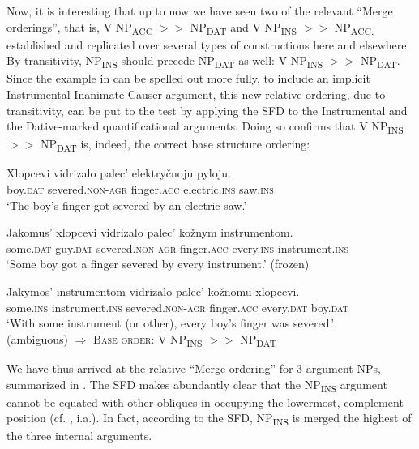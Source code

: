 \documentclass[output=paper,colorlinks,citecolor=brown]{langscibook}
\begin{document}
\noindent Now, it is interesting that up to now we have seen two of the relevant “Merge orderings”, that is, V NP\textsubscript{ACC} $>>$ NP\textsubscript{DAT} and V NP\textsubscript{INS} $>>$ NP\textsubscript{ACC,} established and replicated over several types of constructions here and elsewhere. By transitivity, NP\textsubscript{INS} should precede NP\textsubscript{DAT} as well: V NP\textsubscript{INS} $>>$ NP\textsubscript{DAT}. Since the example in  can be spelled out more fully, to include an implicit Instrumental Inanimate Causer argument, this new relative ordering, due to transitivity, can be put to the test by applying the SFD to the Instrumental and the Dative-marked quantificational arguments. Doing so confirms that V NP\textsubscript{INS} $>>$ NP\textsubscript{DAT} is, indeed, the correct base structure ordering:

\ea%
    \label{ex:antonyuk:29}
\gll            Xlopcevi   vidrizalo    palec’    elektryčnoju pyloju.\\
boy.\textsc{dat}   severed.\textsc{non-agr} finger.\textsc{acc} electric.\textsc{ins} saw.\textsc{ins}\\
\glt ‘The boy’s finger got severed by an electric saw.’
    \z


\ea%
    \label{ex:antonyuk:30}

\ea
\gll   Jakomus’ xlopcevi   vidrizalo    palec’    kožnym instrumentom.\\
some.\textsc{dat} guy.\textsc{dat} severed.\textsc{non-agr}  finger.\textsc{acc} every.\textsc{ins} instrument.\textsc{ins}\\
\glt ‘Some boy got a finger severed by every instrument.’ \hfill (frozen)


\ex
\gll   Jakymos’ instrumentom   vidrizalo     palec’     kožnomu xlopcevi.\\
some.\textsc{ins} instrument.\textsc{ins}    severed.\textsc{non-agr} finger.\textsc{acc} every.\textsc{dat} boy.\textsc{dat}\\
\glt ‘With some instrument (or other), every boy’s finger was severed.’ \\\hfill (ambiguous)
\z
$\Rightarrow$ \textsc{Base order}: V NP\textsubscript{INS} $>>$ NP\textsubscript{DAT}
\z

\noindent We have thus arrived at the relative “Merge ordering” for 3-argument NPs, summarized in . The SFD makes abundantly clear that the NP\textsubscript{INS} argument cannot be equated with other obliques in occupying the lowermost, complement position (cf. \citealt{Pesetsky1995}, i.a.). In fact, according to the SFD, NP\textsubscript{INS} is merged the highest of the three internal arguments.
\end{document}
